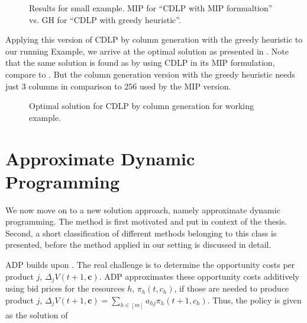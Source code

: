 \begin{figure}[H]
	
	\caption[CDLP results for small example.]{Results for small example. MIP for \enquote{CDLP with MIP formualtion} vs. GH for \enquote{CDLP with greedy heuristic}.\label{txt-CDLP-Greedy}}
\end{figure}

\vspace*{1cm}
\noindent{}
\vspace*{1cm}

Applying this version of CDLP by column generation with the greedy heuristic to our running Example, we arrive at the optimal solution as presented in . Note that the same solution is found as by using CDLP in its MIP formulation, compare to . But the column generation version with the greedy heuristic needs just $3$ columns in comparison to $256$ used by the MIP version.

\begin{figure}[H]
	
	\caption{Optimal solution for CDLP by column generation for working example.\label{txt-CDLP-ColGen-Stefan}}
\end{figure}


\section{Approximate Dynamic Programming}\label{s:ADP}

We now move on to a new solution approach, namely approximate dynamic programming. The method is first motivated and put in context of the thesis. Second, a short classification of different methods belonging to this class is presented, before the method applied in our setting is discussed in detail.

ADP builds upon . The real challenge is to determine the opportunity costs per product $j$, \ie $\Delta_j V(t+1, \boldsymbol{c})$. ADP approximates these opportunity costs additively using bid prices for the resources $h$, $\pi_h(t, c_h)$, if those are needed to produce product $j$, \ie $\Delta_j V(t+1, \boldsymbol{c}) = \sum_{h \in [m]} a_{hj}\pi_{h}(t+1, c_h)$. Thus, the policy is given as the solution of


